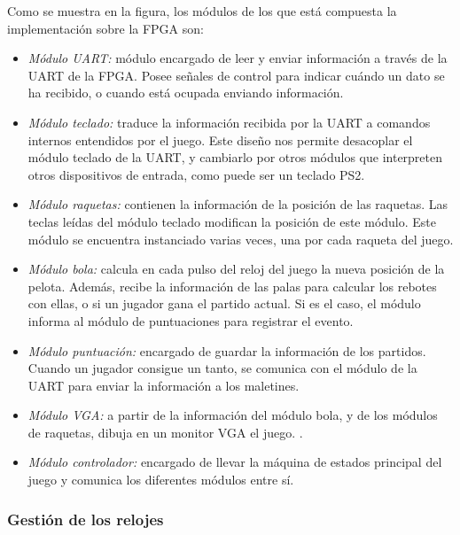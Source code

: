 Como se muestra en la figura, los módulos de los que está compuesta la
implementación sobre la FPGA son:
\begin{itemize}
\item \emph{Módulo UART:} módulo encargado de leer y enviar información a
  través de la UART de la FPGA. Posee señales de control para indicar
  cuándo un dato se ha recibido, o cuando está ocupada enviando
  información.
\item \emph{Módulo teclado:} traduce la información recibida por la UART a
  comandos internos entendidos por el juego. Este diseño nos permite
  desacoplar el módulo teclado de la UART, y cambiarlo por otros módulos
  que interpreten otros dispositivos de entrada, como puede ser un teclado
  PS2.
\item \emph{Módulo raquetas:} contienen la información de la posición de
  las raquetas. Las teclas leídas del módulo teclado modifican la posición
  de este módulo. Este módulo se encuentra instanciado varias veces, una
  por cada raqueta del juego.
\item \emph{Módulo bola:} calcula en cada pulso del reloj del juego la
  nueva posición de la pelota. Además, recibe la información de las palas
  para calcular los rebotes con ellas, o si un jugador gana el partido
  actual. Si es el caso, el módulo informa al módulo de puntuaciones para
  registrar el evento.
\item \emph{Módulo puntuación:} encargado de guardar la información de los
  partidos. Cuando un jugador consigue un tanto, se comunica con el módulo
  de la UART para enviar la información a los maletines.
\item \emph{Módulo VGA:} a partir de la información del módulo bola, y de
  los módulos de raquetas, dibuja en un monitor VGA el juego. .
\item \emph{Módulo controlador:} encargado de llevar la máquina de
  estados principal del juego y comunica los diferentes módulos entre
  sí.
\end{itemize}

\subsubsection{Gestión de los relojes}
\label{s3:subsubsec:clocking}


